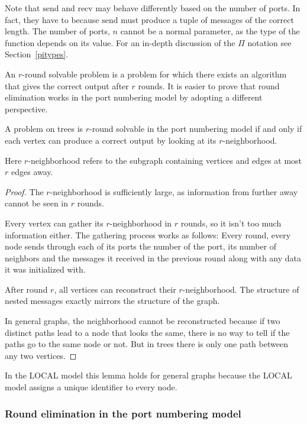 \documentclass[english, 12pt, a4paper, sci, a-1b, online]{aaltothesis}
\begin{document}
Note that $\text{send}$ and $\text{recv}$ may behave differently based on the number of ports. In fact, they have to because $\text{send}$ must produce a tuple of messages of the correct length. The number of ports, $n$ cannot be a normal parameter, as the type of the function depends on its value. For an in-depth discussion of the $\Pi$ notation see Section~\ref{pitypes}.

An $r$-round solvable problem is a problem for which there exists an algorithm that gives the correct output after $r$ rounds. It is easier to prove that round elimination works in the port numbering model by adopting a different perspective.

\begin{lemma}
  A problem on trees is $r$-round solvable in the port numbering model if and only if each vertex can produce a correct output by looking at its $r$-neighborhood.
\end{lemma}
Here $r$-neighborhood refers to the subgraph containing vertices and edges at most $r$ edges away.

\begin{proof}
  The $r$-neighborhood is sufficiently large, as information from further away cannot be seen in $r$ rounds.

  Every vertex can gather its $r$-neighborhood in $r$ rounds, so it isn't too much information either. The gathering process works as follows: Every round, every node sends through each of its ports the number of the port, its number of neighbors and the messages it received in the previous round along with any data it was initialized with.

  After round $r$, all vertices can reconstruct their $r$-neighborhood. The structure of nested messages exactly mirrors the structure of the graph.

  In general graphs, the neighborhood cannot be reconstructed because if two distinct paths lead to a node that looks the same, there is no way to tell if the paths go to the same node or not. But in trees there is only one path between any two vertices.
\end{proof}

In the LOCAL model this lemma holds for general graphs because the LOCAL model assigns a unique identifier to every node.

\subsubsection{Round elimination in the port numbering model}
\end{document}
